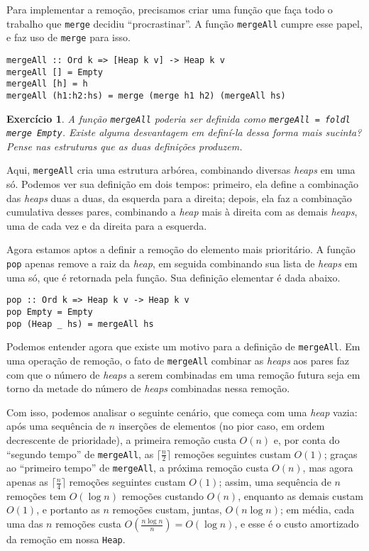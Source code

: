 \documentclass[a4paper]{article}
\newtheorem{exercicio}{Exercício}
\begin{document}
Para implementar a remoção, precisamos criar uma função que faça todo o trabalho que \texttt{merge} decidiu ``procrastinar''.
A função \texttt{mergeAll} cumpre esse papel, e faz uso de \texttt{merge} para isso.

\begin{verbatim}
mergeAll :: Ord k => [Heap k v] -> Heap k v
mergeAll [] = Empty
mergeAll [h] = h
mergeAll (h1:h2:hs) = merge (merge h1 h2) (mergeAll hs)
\end{verbatim}

\begin{exercicio}
	A função \emph{\texttt{mergeAll}} poderia ser definida como \emph{\texttt{mergeAll = foldl merge Empty}}.
	Existe alguma desvantagem em definí-la dessa forma mais sucinta?
	Pense nas estruturas que as duas definições produzem.
\end{exercicio}

Aqui, \texttt{mergeAll} cria uma estrutura arbórea, combinando diversas \emph{heaps} em uma só.
Podemos ver sua definição em dois tempos: primeiro, ela define a combinação das \emph{heaps} duas a duas, da esquerda para a direita; depois, ela faz a combinação cumulativa desses pares, combinando a \emph{heap} mais à direita com as demais \emph{heaps}, uma de cada vez e da direita para a esquerda.

Agora estamos aptos a definir a remoção do elemento mais prioritário.
A função \texttt{pop} apenas remove a raiz da \emph{heap}, em seguida combinando sua lista de \emph{heaps} em uma só, que é retornada pela função.
Sua  definição elementar é dada abaixo.

\begin{verbatim}
pop :: Ord k => Heap k v -> Heap k v
pop Empty = Empty
pop (Heap _ hs) = mergeAll hs
\end{verbatim}

Podemos entender agora que existe um motivo para a definição de \texttt{mergeAll}.
Em uma operação de remoção, o fato de \texttt{mergeAll} combinar as \emph{heaps} aos pares faz com que o número de \emph{heaps} a serem combinadas em uma remoção futura seja em torno da metade do número de \emph{heaps} combinadas nessa remoção.

Com isso, podemos analisar o seguinte cenário, que começa com uma \emph{heap} vazia:
após uma sequência de $n$ inserções de elementos (no pior caso, em ordem decrescente de prioridade), a primeira remoção custa $O(n)$ e, por conta do ``segundo tempo'' de \texttt{mergeAll}, as $\lceil\frac{n}{2}\rceil$ remoções seguintes custam $O(1)$;
graças ao ``primeiro tempo'' de \texttt{mergeAll}, a próxima remoção custa $O(n)$, mas agora apenas as $\lceil\frac{n}{4}\rceil$ remoções seguintes custam $O(1)$;
assim, uma sequência de $n$ remoções tem $O(\log n)$ remoções custando $O(n)$, enquanto as demais custam $O(1)$, e portanto as $n$ remoções custam, juntas, $O(n \log n)$;
em média, cada uma das $n$ remoções custa $O(\frac{n \log n}{n}) = O(\log n)$, e esse é o custo amortizado da remoção em nossa \texttt{Heap}.
\end{document}
